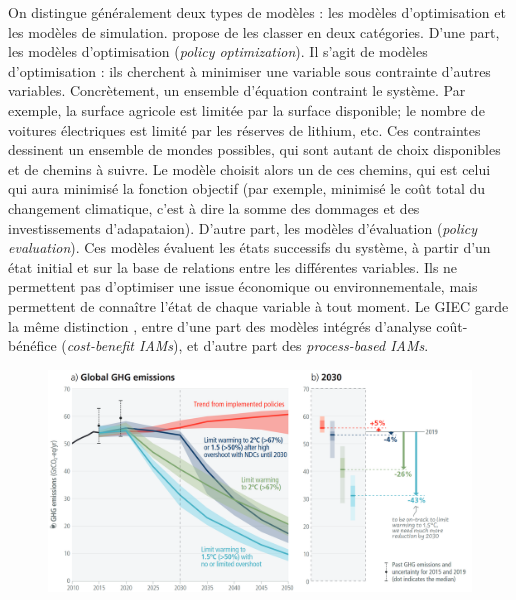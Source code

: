 On distingue généralement deux types de modèles : les modèles d'optimisation et les modèles de simulation.  
\textcite{nordhaus_dice_2013} propose de les classer en deux catégories. D'une part, les modèles d'optimisation (\emph{policy optimization}). Il s'agit de modèles d'optimisation : ils cherchent à minimiser une variable sous contrainte d'autres variables. Concrètement, un ensemble d'équation contraint le système. Par exemple, la surface agricole est limitée par la surface disponible; le nombre de voitures électriques est limité par les réserves de lithium, etc. Ces contraintes dessinent un ensemble de mondes possibles, qui sont autant de choix disponibles et de chemins à suivre. Le modèle choisit alors un de ces chemins, qui est celui qui aura minimisé la fonction objectif (par exemple, minimisé le coût total du changement climatique, c'est à dire la somme des dommages et des investissements d'adapataion). D'autre part, les modèles d'évaluation (\emph{policy evaluation}). Ces modèles évaluent les états successifs du système, à partir d'un état initial et sur la base de relations entre les différentes variables. Ils ne permettent pas d'optimiser une issue économique ou environnementale, mais permettent de connaître l'état de chaque variable à tout moment. 
Le \Gls{GIEC} garde la même distinction , entre d'une part des modèles intégrés d'analyse coût-bénéfice (\emph{cost-benefit IAMs}), et d'autre part des \emph{process-based IAMs}\autocite{intergovernmental_panel_on_climate_change_ipcc_annex_2023}.



\begin{figure}
    \centering
    \includegraphics[width=0.9\linewidth]{figures/spm2_5.png}
    \label{fig:ipcc-pathways}
\end{figure}

